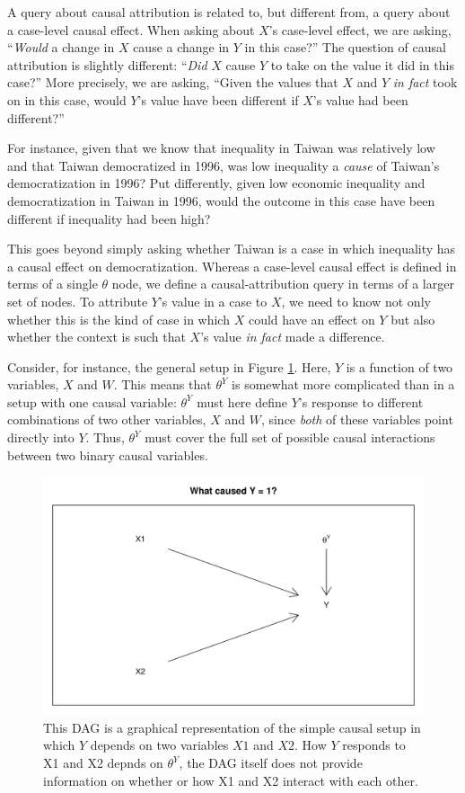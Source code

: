 \documentclass[
  12pt,
]{book}
\begin{document}
A query about causal attribution is related to, but different from, a query about a case-level causal effect. When asking about \(X\)'s case-level effect, we are asking, ``\emph{Would} a change in \(X\) cause a change in \(Y\) in this case?'' The question of causal attribution is slightly different: ``\emph{Did} \(X\) cause \(Y\) to take on the value it did in this case?'' More precisely, we are asking, ``Given the values that \(X\) and \(Y\) \emph{in fact} took on in this case, would \(Y\)'s value have been different if \(X\)'s value had been different?''

For instance, given that we know that inequality in Taiwan was relatively low and that Taiwan democratized in 1996, was low inequality a \emph{cause} of Taiwan's democratization in 1996? Put differently, given low economic inequality and democratization in Taiwan in 1996, would the outcome in this case have been different if inequality had been high?

This goes beyond simply asking whether Taiwan is a case in which inequality has a causal effect on democratization. Whereas a case-level causal effect is defined in terms of a single \(\theta\) node, we define a causal-attribution query in terms of a larger set of nodes. To attribute \(Y\)'s value in a case to \(X\), we need to know not only whether this is the kind of case in which \(X\) could have an effect on \(Y\) but also whether the context is such that \(X\)'s value \emph{in fact} made a difference.

Consider, for instance, the general setup in Figure \ref{fig:attribquery}. Here, \(Y\) is a function of two variables, \(X\) and \(W\). This means that \(\theta^Y\) is somewhat more complicated than in a setup with one causal variable: \(\theta^Y\) must here define \(Y\)'s response to different combinations of two other variables, \(X\) and \(W\), since \emph{both} of these variables point directly into \(Y\). Thus, \(\theta^Y\) must cover the full set of possible causal interactions between two binary causal variables.

\begin{figure}

{\centering \includegraphics[width=.5\textwidth]{ii_files/figure-latex/attribquery-1} 

}

\caption{\label{fig:attribquery} This DAG is a graphical representation of the simple causal setup in which $Y$ depends on two variables $X1$ and $X2$. How $Y$ responds to X1 and X2 depnds on $\theta^Y$, the DAG itself does not provide information on whether or how X1 and X2 interact with each other.}\label{fig:attribquery}
\end{figure}
\end{document}
